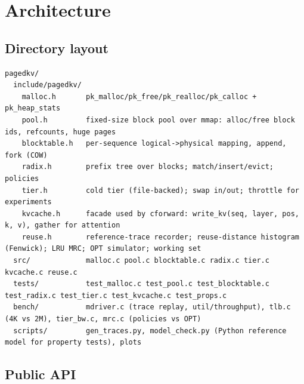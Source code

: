 \section{Architecture}

\subsection{Directory layout}

\begin{lstlisting}[style=plain]
pagedkv/
  include/pagedkv/
    malloc.h       pk_malloc/pk_free/pk_realloc/pk_calloc + pk_heap_stats
    pool.h         fixed-size block pool over mmap: alloc/free block ids, refcounts, huge pages
    blocktable.h   per-sequence logical->physical mapping, append, fork (COW)
    radix.h        prefix tree over blocks; match/insert/evict; policies
    tier.h         cold tier (file-backed); swap in/out; throttle for experiments
    kvcache.h      facade used by cforward: write_kv(seq, layer, pos, k, v), gather for attention
    reuse.h        reference-trace recorder; reuse-distance histogram (Fenwick); LRU MRC; OPT simulator; working set
  src/             malloc.c pool.c blocktable.c radix.c tier.c kvcache.c reuse.c
  tests/           test_malloc.c test_pool.c test_blocktable.c test_radix.c test_tier.c test_kvcache.c test_props.c
  bench/           mdriver.c (trace replay, util/throughput), tlb.c (4K vs 2M), tier_bw.c, mrc.c (policies vs OPT)
  scripts/         gen_traces.py, model_check.py (Python reference model for property tests), plots
\end{lstlisting}

\subsection{Public API}

